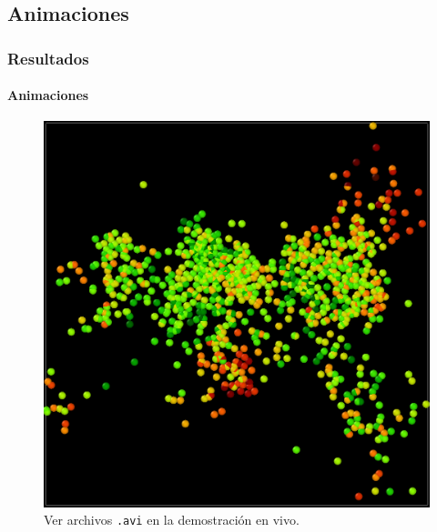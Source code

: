 \documentclass[hyperref={pdfpagelayout=SinglePage}]{beamer}
\begin{document}
\subsection{Animaciones}

\begin{frame}
\frametitle{Resultados}
\framesubtitle{Animaciones}
\begin{figure}[H]
        \centering
        \includegraphics[width=0.70\textheight]{screenshot.png}
        \caption{Ver archivos \texttt{.avi} en la demostración en vivo.}
\end{figure}
\end{frame}
\end{document}

